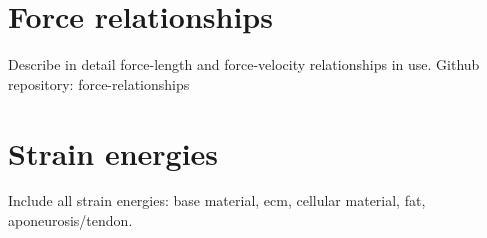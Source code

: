 \documentclass{sfuthesis}
\numberwithin{equation}{chapter}
\numberwithin{figure}{chapter}
\numberwithin{table}{chapter}
\theoremstyle{definition}
\begin{document}
\begin{appendices}
\chapter{Force relationships}

Describe in detail force-length and force-velocity relationships in use.
Github repository: force-relationships

\chapter{Strain energies}

Include all strain energies: base material, ecm, cellular material, fat, aponeurosis/tendon.

\end{appendices}
\end{document}
